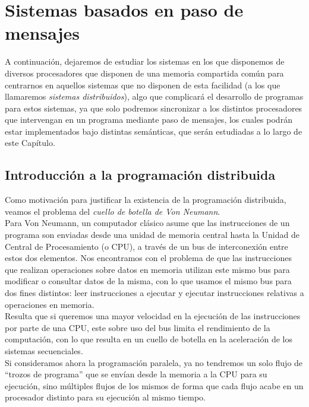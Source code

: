\chapter{Sistemas basados en paso de mensajes}

A continuación, dejaremos de estudiar los sistemas en los que disponemos de diversos procesadores que disponen de una memoria compartida común para centrarnos en aquellos sistemas que no disponen de esta facilidad (a los que llamaremos \textit{sistemas distribuidos}), algo que complicará el desarrollo de programas para estos sistemas, ya que solo podremos sincronizar a los distintos procesadores que intervengan en un programa mediante paso de mensajes, los cuales podrán estar implementados bajo distintas semánticas, que serán estudiadas a lo largo de este Capítulo.

\section{Introducción a la programación distribuida}
Como motivación para justificar la existencia de la programación distribuida, veamos el problema del \textit{cuello de botella de Von Neumann}.\\

Para Von Neumann, un computador clásico asume que las instrucciones de un programa son enviadas desde una unidad de memoria central hasta la Unidad de Central de Procesamiento (o CPU), a través de un bus de interconexión entre estos dos elementos. Nos encontramos con el problema de que las instrucciones que realizan operaciones sobre datos en memoria utilizan este mismo bus para modificar o consultar datos de la misma, con lo que usamos el mismo bus para dos fines distintos: leer instrucciones a ejecutar y ejecutar instrucciones relativas a operaciones en memoria.\\

Resulta que si queremos una mayor velocidad en la ejecución de las instrucciones por parte de una CPU, este sobre uso del bus limita el rendimiento de la computación, con lo que resulta en un cuello de botella en la aceleración de los sistemas secuenciales.\\

Si consideramos ahora la programación paralela, ya no tendremos un solo flujo de ``trozos de programa''  que se envían desde la memoria a la CPU para su ejecución, sino múltiples flujos de los mismos de forma que cada flujo acabe en un procesador distinto para su ejecución al mismo tiempo.

